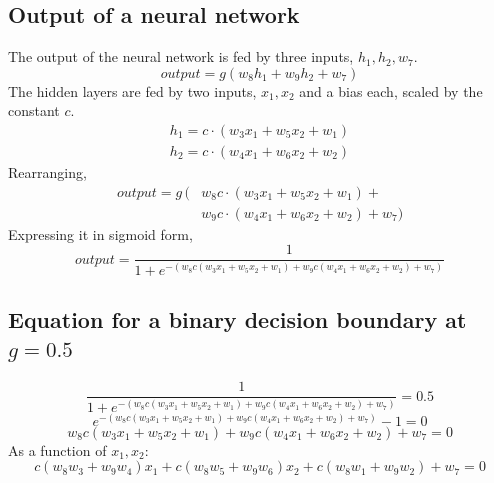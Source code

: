 \documentclass[twocolumn, 9pt]{article}
\begin{document}
\subsection*{Output of a neural network}
The output of the neural network is fed by three inputs, $h_1, h_2, w_7$.
\begin{equation*}
	output = g(w_8h_1 + w_9h_2 + w_7)
\end{equation*}
The hidden layers are fed by two inputs, $x_1, x_2$ and a bias each, scaled by the constant $c$.
\begin{equation*}
\begin{split}
	h_1 = c\cdot(w_3x_1 + w_5x_2 + w_1)\\
	h_2 = c\cdot(w_4x_1 + w_6x_2 + w_2)
\end{split}
\end{equation*}
Rearranging,
\begin{equation*}
\begin{split}
	output = g\,(&w_8c\cdot(w_3x_1 + w_5x_2 + w_1) + \\
	&w_9c\cdot(w_4x_1 + w_6x_2 + w_2) + w_7)
\end{split}
\end{equation*}
Expressing it in sigmoid form,
\begin{equation*}
	output = \dfrac{1}{1+e^{-(w_8c(w_3x_1 + w_5x_2 + w_1) + w_9c(w_4x_1 + w_6x_2 + w_2) + w_7)}}
\end{equation*}

\subsection*{Equation for a binary decision boundary at $g=0.5$}
\begin{equation*}
	\dfrac{1}{1+e^{-(w_8c(w_3x_1 + w_5x_2 + w_1) + w_9c(w_4x_1 + w_6x_2 + w_2) + w_7)}} = 0.5
\end{equation*}
\begin{equation*}
	e^{-(w_8c(w_3x_1 + w_5x_2 + w_1) + w_9c(w_4x_1 + w_6x_2 + w_2) + w_7)}-1= 0
\end{equation*}
\begin{equation*}
	w_8c(w_3x_1 + w_5x_2 + w_1) + w_9c(w_4x_1 + w_6x_2 + w_2) + w_7 = 0
\end{equation*}
As a function of $x_1, x_2$:
\begin{equation*}
	c(w_8w_3+w_9w_4)x_1 + c(w_8w_5+w_9w_6)x_2 +c(w_8w_1 + w_9w_2) + w_7= 0
\end{equation*}
\end{document}
